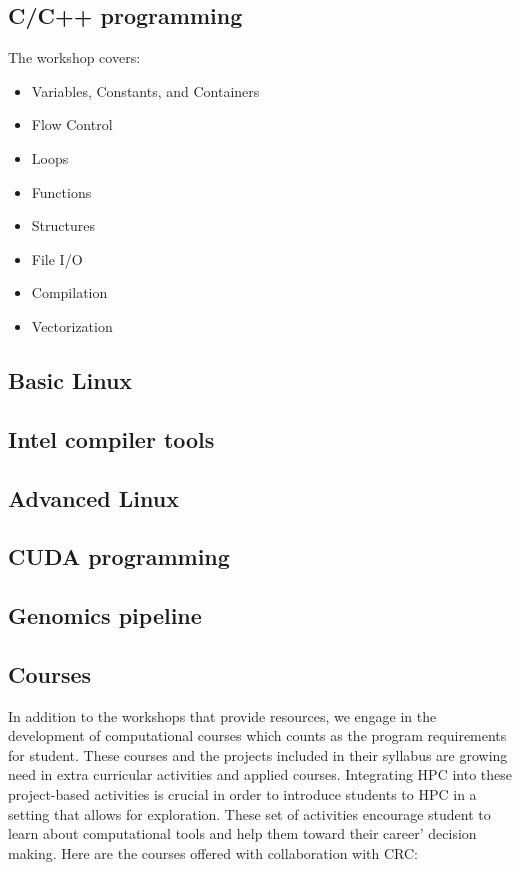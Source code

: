 \documentclass[conference]{IEEEtran}
\begin{document}
\subsection*{C/C++ programming}
The workshop covers:
    \begin{itemize}
    \item Variables, Constants, and Containers
    \item Flow Control
    \item Loops
    \item Functions
    \item Structures
    \item File I/O
    \item Compilation
    \item Vectorization
    \end{itemize}

\subsection*{Basic Linux}
\subsection*{Intel compiler tools}
\subsection*{Advanced Linux}
\subsection*{CUDA programming}
\subsection*{Genomics pipeline}


\subsection{Courses}
In  addition  to  the  workshops that provide  resources, we engage in the development of computational courses which counts as the program requirements for student. These courses and the projects included in their syllabus are  growing  need  in  extra  curricular  activities
and applied courses. Integrating HPC into these project-based
activities  is  crucial  in  order  to  introduce  students  to  HPC  in
a setting that allows for exploration. These set of activities encourage student to learn about computational tools and help them toward their career' decision making. Here are the courses offered with collaboration with CRC:
\end{document}
